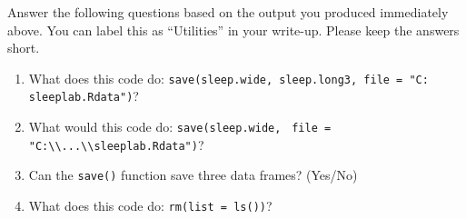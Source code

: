 \documentclass[]{article}
\begin{document}
Answer the following questions based on the output you produced immediately above. You can label this as ``Utilities'' in your write-up. Please keep the answers short.

\begin{enumerate}[resume]
\item What does this code do: \texttt{save(sleep.wide, sleep.long3, file = "C:\\sleeplab.Rdata")}?
\item What would this code do: \texttt{save(sleep.wide, } \verb,file = "C:\\...\\sleeplab.Rdata"),?
\item Can the \texttt{save()} function save three data frames? (Yes/No)
\item What does this code do: \texttt{rm(list = ls())}?
\end{enumerate}
\end{document}
